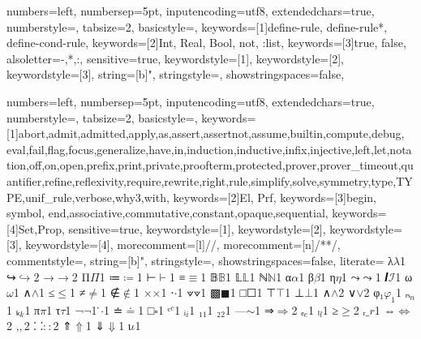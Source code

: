 {
  numbers=left,
  numbersep=5pt,
  inputencoding=utf8,
  extendedchars=true,
  numberstyle=\footnotesize,
  tabsize=2,
  basicstyle={\ttfamily\scriptsize\upshape},
  keywords=[1]{define-rule, define-rule*, define-cond-rule},
  keywords=[2]{Int, Real, Bool, not, :list},
  keywords=[3]{true, false},
  alsoletter={-,*,:},
  sensitive=true,
  keywordstyle={[1]\color{mylpurple}},
  keywordstyle={[2]\color{RoyalBlue}},
  keywordstyle={[3]\color{mypurple}},
  string=[b]{"},
  stringstyle=\color{RedOrange},
  showstringspaces=false,
}

\newcommand{\sub}[1]{\ensuremath{_{\!#1}}}


{
  numbers=left,
  numbersep=5pt,
  inputencoding=utf8,
  extendedchars=true,
  numberstyle=\footnotesize,
  tabsize=2,
  basicstyle={\ttfamily\scriptsize\upshape},
  keywords=[1]{abort,admit,admitted,apply,as,assert,assertnot,assume,builtin,compute,debug, eval,fail,flag,focus,generalize,have,in,induction,inductive,infix,injective,left,let,notation,off,on,open,prefix,print,private,proofterm,protected,prover,prover_timeout,quantifier,refine,reflexivity,require,rewrite,right,rule,simplify,solve,symmetry,type,TYPE,unif_rule,verbose,why3,with},
  keywords=[2]{El, Prf},
  keywords=[3]{begin, symbol, end,associative,commutative,constant,opaque,sequential},
  keywords=[4]{Set,Prop},
  sensitive=true,
  keywordstyle={[1]\bfseries\color{purple}},
  keywordstyle={[2]\bfseries\color{purple}},
  keywordstyle={[3]\bfseries\color{violet}},
  keywordstyle={[4]\bfseries\color{blue}},
  morecomment=[l]{//},
  morecomment=[n]{/*}{*/},
  commentstyle={\itshape\color{teal}},
  string=[b]{"},
  stringstyle=\color{RedOrange},
  showstringspaces=false,
  literate=
  {λ}{$\lambda$}1
  {↪}{$\hookrightarrow$}2
  {→}{$\rightarrow$}2
  {Π}{$\Pi$}1
  {≔}{$\coloneqq$}1
  {⊢}{$\vdash$}1
  {≡}{$\equiv$}1
  {𝔹}{$\mathbb{B}$}1
  {𝕃}{$\mathbb{L}$}1
  {ℕ}{$\mathbb{N}$}1
  {α}{$\alpha$}1
  {β}{$\beta$}1
  {η}{$\eta$}1
  {⤳}{$\rightcurvedarrow$}1
  {𝑰}{$\mathcal{I}$}1
  {ω}{$\omega$}1
  {∧}{$\wedge$}1
  {≤}{$\le$}1
  {≠}{$\neq$}1
  {∉}{$\notin$}1
  {×}{$\times$}1
  {⋅}{$\cdot$}1
  {⟇}{$\veedot$}1
  {▩}{$\blacksquare$}1
  {□}{$\Square$}1
  {⊤}{$\top$}1
  {⊥}{$\bot$}1
  {∧}{$\land$}2
  {∨}{$\lor$}2
  {φ₁}{$\varphi_1$}1
  {ₙ}{$_n$}1
  {ₖ}{$_k$}1
  {π}{$\pi$}1
  {τ}{$\tau$}1
  {¬}{$\neg$}1
  { ̇}{$\cdot$}1
  {≐}{$\doteq$}1
  {□}{$\square$}1
  {ᶜ}{${^c}$}1
  {ᵢ}{$\sub{i}$}1
  {₁}{$\sub{1}$}1
  {₂}{$\sub{2}$}1
  {—}{$\sim$}1
  {⇒}{$\Rightarrow$}2
  {ₑ}{${_e}$}1
  {ₗ}{${_l}$}1
  {≥}{$\geq$}2
  {ᵣ}{$\_r$}1
  {⇔}{$\Leftrightarrow$}2
  {‚}{$,$}2
  {⸬}{$\colon\colon$}2
  {⇑}{$\Uparrow$}1
  {⇓}{$\Downarrow$}1
  {ι}{$\iota$}1
}


\newcommand\smtinline[1]{\lstinline[language=SMT,basicstyle=\ttfamily\normalsize]|#1|}
\newcommand\rareinline[1]{\lstinline[language=RARE,basicstyle=\ttfamily\normalsize]|#1|}
\newcommand\lpinline[1]{\lstinline[language=Lambdapi,basicstyle=\ttfamily\normalsize]|#1|}